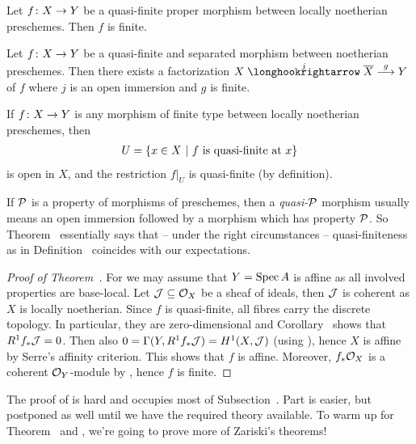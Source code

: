 \documentclass[a4paper,parskip=half,numbers=enddot, DIV=12]{scrreprt}
\begin{document}
\begin{thm}
	\begin{alphanumerate}
		\item {}Let $f\colon X\morphism Y$ be a quasi-finite proper morphism between locally noetherian preschemes. Then $f$ is finite.
		\item Let $f\colon X\morphism Y$ be a quasi-finite and separated morphism between noetherian preschemes. Then there exists a factorization $X\monomorphism[j]\ov{X}\morphism[g]Y$ of $f$ where $j$ is an open immersion and $g$ is finite.
		\item If $f\colon X\morphism Y$ is any morphism of finite type between locally noetherian preschemes, then 
		\begin{align*}
			U=\left\{x\in X\ \middle|\  f\text{ is quasi-finite at }x\right\}
		\end{align*}
		is open in $X$, and the restriction $f|_U$ is quasi-finite (by definition).
	\end{alphanumerate}
\end{thm}
\begin{rem}
	If $\mathcal{P}$ is a property of morphisms of preschemes, then a \emph{quasi-$\mathcal{P}$} morphism usually means an open immersion followed by a morphism which has property $\mathcal{P}$. So Theorem~ essentially says that -- under the right circumstances -- quasi-finiteness as in Definition~ coincides with our expectations.
\end{rem}
\begin{proof}[Proof of Theorem~]
	For  we may assume that $Y=\operatorname{Spec} A$ is affine as all involved properties are base-local. Let $\mathcal{J}\subseteq \mathcal{O}_X$ be a sheaf of ideals, then $\mathcal{J}$ is coherent as $X$ is locally noetherian. Since $f$ is quasi-finite, all fibres carry the discrete topology. In particular, they are zero-dimensional and Corollary~ shows that $R^1f_*\mathcal{J}=0$. Then also $0=\Gamma(Y,R^1f_*\mathcal{J})=H^1(X,\mathcal{J})$ (using \cite[Proposition~1.5.1]{alggeo2}), hence $X$ is affine by Serre's affinity criterion. This shows that $f$ is affine. Moreover, $f_*\mathcal{O}_X$ is a coherent $\mathcal{O}_Y$-module by \cite[Theorem~5]{alggeo2}, hence $f$ is finite.
\end{proof}
 The proof of  is hard and occupies most of Subsection~. Part  is easier, but postponed as well until we have the required theory available. To warm up for Theorem~ and , we're going to prove more of Zariski's theorems!
\end{document}
